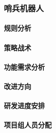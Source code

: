 \subsubsection{哨兵机器人}

    \paragraph{规则分析}
    
    \paragraph{策略战术}
    
    \paragraph{功能需求分析}
    
    \paragraph{改进方向}

    \paragraph{研发进度安排}

    \paragraph{项目组人员分配}
    